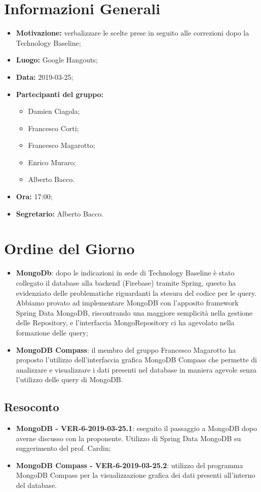 \documentclass[a4paper, oneside, openany, dvipsnames, table]{article}
\begin{document}
\copertina{}


\newpage
\tableofcontents
\newpage
\section{Informazioni Generali}
\begin{itemize}
\item \textbf{Motivazione:} verbalizzare le scelte prese in seguito alle correzioni dopo la Technology Baseline;
\item \textbf{Luogo:} Google Hangouts;
\item \textbf{Data:} 2019-03-25;
\item \textbf{Partecipanti del gruppo:} \hfill
	\begin{itemize}
		\item Damien Ciagola;
		\item Francesco Corti;
		\item Francesco Magarotto;
		\item Enrico Muraro;
		\item Alberto Bacco.
	\end{itemize} 
\item \textbf{Ora:} 17:00;
\item \textbf{Segretario:} Alberto Bacco.
\end{itemize}

\section{Ordine del Giorno}
\begin{itemize}
	\item \textbf{MongoDb}: 
	dopo le indicazioni in sede di Technology Baseline è stato 
	collegato il database alla backend (Firebase) tramite Spring, questo ha evidenziato delle problematiche riguardanti la stesura
	del codice per le query. 
	Abbiamo provato ad implementare MongoDB con l'apposito framework Spring Data MongoDB, riscontrando
	una maggiore semplicità nella gestione delle Repository, e
	l'interfaccia MongoRepository ci ha agevolato nella 
	formazione delle query;
	\item \textbf{MongoDB Compass}: il membro del gruppo Francesco Magarotto ha proposto l'utilizzo dell'interfaccia grafica MongoDB Compass che permette di analizzare e visualizzare  i dati presenti nel database in maniera agevole senza l'utilizzo delle query di MongoDB. 
\end{itemize}

\subsection{Resoconto}
\begin{itemize}
	\item \textbf{MongoDB - VER-6-2019-03-25.1}: 
	eseguito il passaggio a MongoDB dopo averne discusso con la 
	proponente. Utilizzo di Spring Data MongoDB su suggerimento del prof. Cardin;
	\item \textbf{MongoDB Compass - VER-6-2019-03-25.2}:
	utilizzo del programma MongoDB Compass per la visualizzazione grafica dei dati presenti all'interno del database.
	
	
\end{itemize}
\end{document}
